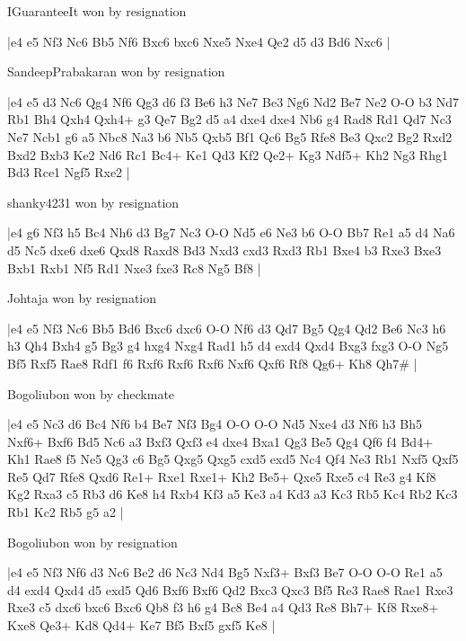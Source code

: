 \showboard

IGuaranteeIt won by resignation

\makegametitle
|e4 e5 Nf3 Nc6 Bb5 Nf6 Bxc6 bxc6 Nxe5 Nxe4 Qe2 d5 d3 Bd6 Nxc6  |

\showboard

SandeepPrabakaran won by resignation

\makegametitle
|e4 e5 d3 Nc6 Qg4 Nf6 Qg3 d6 f3 Be6 h3 Ne7 Be3 Ng6 Nd2 Be7 Ne2 O-O b3 Nd7 Rb1 Bh4 Qxh4 Qxh4+ g3 Qe7 Bg2 d5 a4 dxe4 dxe4 Nb6 g4 Rad8 Rd1 Qd7 Nc3 Ne7 Ncb1 g6 a5 Nbc8 Na3 b6 Nb5 Qxb5 Bf1 Qc6 Bg5 Rfe8 Be3 Qxc2 Bg2 Rxd2 Bxd2 Bxb3 Ke2 Nd6 Rc1 Bc4+ Ke1 Qd3 Kf2 Qe2+ Kg3 Ndf5+ Kh2 Ng3 Rhg1 Bd3 Rce1 Ngf5 Rxe2  |

\showboard

shanky4231 won by resignation

\makegametitle
|e4 g6 Nf3 h5 Bc4 Nh6 d3 Bg7 Nc3 O-O Nd5 e6 Ne3 b6 O-O Bb7 Re1 a5 d4 Na6 d5 Nc5 dxe6 dxe6 Qxd8 Raxd8 Bd3 Nxd3 cxd3 Rxd3 Rb1 Bxe4 b3 Rxe3 Bxe3 Bxb1 Rxb1 Nf5 Rd1 Nxe3 fxe3 Rc8 Ng5 Bf8  |

\showboard

Johtaja won by resignation

\makegametitle
|e4 e5 Nf3 Nc6 Bb5 Bd6 Bxc6 dxc6 O-O Nf6 d3 Qd7 Bg5 Qg4 Qd2 Be6 Nc3 h6 h3 Qh4 Bxh4 g5 Bg3 g4 hxg4 Nxg4 Rad1 h5 d4 exd4 Qxd4 Bxg3 fxg3 O-O Ng5 Bf5 Rxf5 Rae8 Rdf1 f6 Rxf6 Rxf6 Rxf6 Nxf6 Qxf6 Rf8 Qg6+ Kh8 Qh7\#  |

\showboard

Bogoliubon won by checkmate

\makegametitle
|e4 e5 Nc3 d6 Bc4 Nf6 b4 Be7 Nf3 Bg4 O-O O-O Nd5 Nxe4 d3 Nf6 h3 Bh5 Nxf6+ Bxf6 Bd5 Nc6 a3 Bxf3 Qxf3 e4 dxe4 Bxa1 Qg3 Be5 Qg4 Qf6 f4 Bd4+ Kh1 Rae8 f5 Ne5 Qg3 c6 Bg5 Qxg5 Qxg5 cxd5 exd5 Nc4 Qf4 Ne3 Rb1 Nxf5 Qxf5 Re5 Qd7 Rfe8 Qxd6 Re1+ Rxe1 Rxe1+ Kh2 Be5+ Qxe5 Rxe5 c4 Re3 g4 Kf8 Kg2 Rxa3 c5 Rb3 d6 Ke8 h4 Rxb4 Kf3 a5 Ke3 a4 Kd3 a3 Kc3 Rb5 Kc4 Rb2 Kc3 Rb1 Kc2 Rb5 g5 a2  |

\showboard

Bogoliubon won by resignation

\makegametitle
|e4 e5 Nf3 Nf6 d3 Nc6 Be2 d6 Nc3 Nd4 Bg5 Nxf3+ Bxf3 Be7 O-O O-O Re1 a5 d4 exd4 Qxd4 d5 exd5 Qd6 Bxf6 Bxf6 Qd2 Bxc3 Qxc3 Bf5 Re3 Rae8 Rae1 Rxe3 Rxe3 c5 dxc6 bxc6 Bxc6 Qb8 f3 h6 g4 Bc8 Be4 a4 Qd3 Re8 Bh7+ Kf8 Rxe8+ Kxe8 Qe3+ Kd8 Qd4+ Ke7 Bf5 Bxf5 gxf5 Ke8  |

